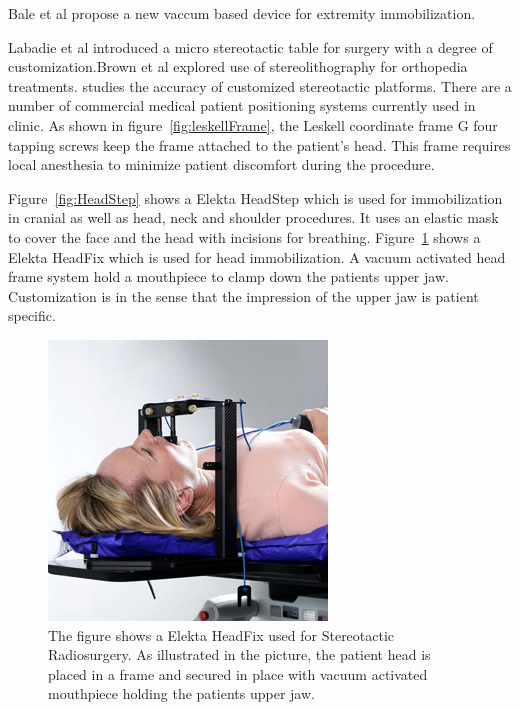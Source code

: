 Bale et al \cite{bale1999new} propose a new vaccum based device for
extremity immobilization. 


Labadie et al \cite{labadie2009customized} introduced a micro stereotactic table for surgery with a degree of customization.Brown et al\cite{brown2002application} explored use of stereolithography for orthopedia treatments.\cite{fitzpatrick2005accuracy} studies the accuracy of customized 
stereotactic platforms.
There are a number of commercial medical patient positioning systems currently
used in clinic. As shown in figure~\ref{fig:leskellFrame}, the Leskell coordinate frame G four tapping screws
keep the frame attached to the patient's head. This frame requires local 
anesthesia to minimize patient discomfort during the procedure. 

Figure~\ref{fig:HeadStep} shows a Elekta HeadStep which is used for
immobilization in cranial as well as head, neck and shoulder procedures.
It uses an elastic mask to cover the face and the head with incisions for 
breathing. Figure~\ref{fig:HeadFix} shows a Elekta HeadFix which is used for
head immobilization. A vacuum activated head frame system hold a mouthpiece
to clamp down the patients upper jaw. Customization is in the sense that the impression of the upper jaw is patient specific. 


\begin{figure}[t!]
  \begin{center}
    \includegraphics[width=0.9\linewidth]{images/headfix}
  \end{center}
  \vspace{-10pt}
\caption{ The figure shows a Elekta HeadFix used for Stereotactic Radiosurgery.
As illustrated in the picture, the patient head is placed in a frame and secured in place with vacuum activated mouthpiece holding the patients upper jaw.}
  \vspace*{-15pt}
  \label{fig:HeadFix}
\end{figure}


